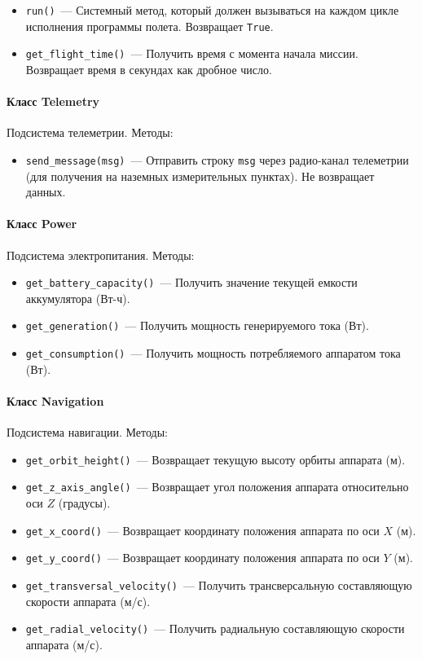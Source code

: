 \documentclass[12pt,a4paper]{article}
\begin{document}
\begin{itemize}
\item \verb'run()'~--- Системный метод, который должен вызываться на каждом цикле
  исполнения программы полета. Возвращает \verb'True'.
\item \verb'get_flight_time()'~--- Получить время с момента начала миссии. Возвращает
  время в секундах как дробное число.
\end{itemize}
  
\paragraph{Класс Telemetry}

Подсистема телеметрии. Методы:

\begin{itemize}
\item \verb'send_message(msg)'~--- Отправить строку \verb'msg' через радио-канал
  телеметрии (для получения на наземных измерительных пунктах). Не возвращает данных.
\end{itemize}

\paragraph{Класс Power}

Подсистема электропитания. Методы:

\begin{itemize}
\item \verb'get_battery_capacity()'~--- Получить значение текущей емкости аккумулятора (Вт-ч).
\item \verb'get_generation()'~--- Получить мощность генерируемого тока (Вт).
\item \verb'get_consumption()'~--- Получить мощность потребляемого аппаратом тока (Вт).
\end{itemize}

\paragraph{Класс Navigation}

Подсистема навигации. Методы:

\begin{itemize}
\item \verb'get_orbit_height()'~--- Возвращает текущую высоту орбиты аппарата (м).
\item \verb'get_z_axis_angle()'~--- Возвращает угол положения аппарата относительно оси $Z$ (градусы).
\item \verb'get_x_coord()'~--- Возвращает координату положения аппарата по оси $X$ (м).
\item \verb'get_y_coord()'~--- Возвращает координату положения аппарата по оси $Y$ (м).
\item \verb'get_transversal_velocity()'~--- Получить трансверсальную составляющую скорости аппарата (м/с).
\item \verb'get_radial_velocity()'~--- Получить радиальную составляющую скорости аппарата (м/с).
\end{itemize}
\end{document}
